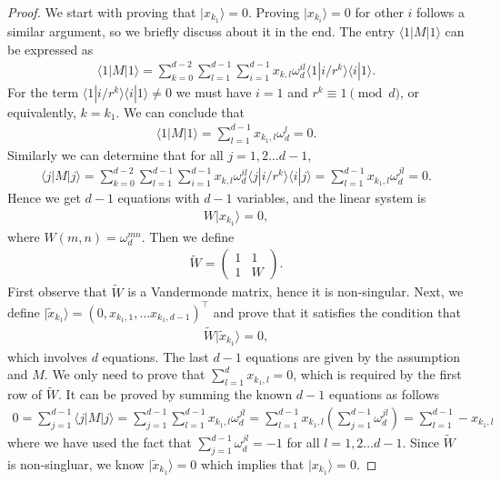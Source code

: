\documentclass[11pt,letterpaper]{article}
\newcommand{\ket}[1]{|#1\rangle}
\newcommand{\bra}[1]{\langle#1|}
\newcommand{\braket}[2]{\langle#1|#2\rangle}
\newcommand{\1}{\mathbb{1}}
\newcommand{\tW}{\tilde{W}}
\newcommand{\tx}{\tilde{x}}
\theoremstyle{definition}
\begin{document}
\begin{proof}
We start with proving that $\ket{x_{k_1}} = 0$.
Proving $\ket{x_{k_i}} = 0$ for other $i$ follows a similar argument, so we briefly
discuss about it in the end.
The entry $\bra{1}M\ket{1}$ can be expressed as  
\begin{align}
	\bra{1}M\ket{1} = \sum_{k=0}^{d-2}\sum_{l = 1}^{d-1}\sum_{i=1}^{d-1} x_{k, l}\omega_d^{il}\braket{1}{i/r^k}\braket{i}{1}.
\end{align}
For the term $\braket{1}{i/r^k}\braket{i}{1} \neq 0$ we must have $i = 1$ and $r^k \equiv 1 \pmod{d}$, or equivalently,
$k = k_1$. We can conclude that 
\begin{align}
	\bra{1}M\ket{1} = \sum_{l = 1}^{d-1} x_{k_1,l}\omega_d^l = 0. 
\end{align}
Similarly we can determine that for all $j = 1,2\dots d-1$,
\begin{align}
	\bra{j}M\ket{j} 
	=  \sum_{k=0}^{d-2}\sum_{l = 1}^{d-1}\sum_{i=1}^{d-1} x_{k, l}\omega_d^{il}\braket{j}{i/r^k}\braket{i}{j} 
	= \sum_{l = 1}^{d-1}x_{k_1,l}\omega_d^{jl} = 0.
\end{align}
Hence we get $d-1$ equations with $d-1$ variables, and the linear system is
\begin{align}
	W \ket{x_{k_1}} = 0,
\end{align}
where $W(m,n) = \omega_d^{mn}$. Then we define
\begin{align}
	\tW = 
	\begin{pmatrix}
	1 & 1 \\
	1 & W
	\end{pmatrix}.
\end{align}
First observe that $\tW$ is a Vandermonde matrix, hence it is non-singular.
Next, we define $\ket{\tx_{k_1}} = (0, x_{k_1,1}, \dots x_{k_1,d-1})^\intercal$ 
and prove that it satisfies the condition
that 
\begin{align}
	\tW \ket{\tx_{k_1}} = 0,
\end{align}
which involves $d$ equations. The last $d-1$ equations are given by the assumption and $M$.
We only need to prove that $\sum_{l=1}^d x_{k_1, l} = 0$, which is required by the first row of $\tW$.
It can be proved by summing the known $d-1$ equations as follows
\begin{align}
	0=\sum_{j = 1}^{d-1} \bra{j}M\ket{j}  
	=  \sum_{j=1}^{d-1}\sum_{l = 1}^{d-1}x_{k_1,l}\omega_d^{jl}
	=\sum_{l = 1}^{d-1}x_{k_1,l} (\sum_{j=1}^{d-1} \omega_d^{jl})
	= \sum_{l = 1}^{d-1}- x_{k_1,l}
\end{align}
where we have used the fact that $\sum_{j=1}^{d-1} \omega_d^{jl} =-1$ for all $l = 1,2\dots d-1$.
Since $\tW$ is non-singluar, we know $\ket{\tx_{k_1}} = 0$ which implies that $\ket{x_{k_1}} = 0$.


\end{proof}
\end{document}
